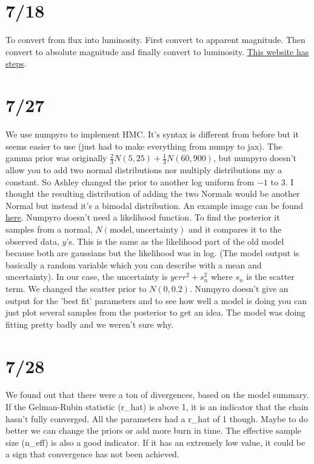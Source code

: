 \documentclass[12pt]{article}
\begin{document}
\section{7/18}
To convert from flux into luminosity. First convert to apparent magnitude. Then convert to absolute magnitude and finally convert to luminosity. \href{http://csep10.phys.utk.edu/OJTA2dev/ojta/c2c/ordinary_stars/magnitudes/absolute_tl.html}{This website has steps}. 


\section{7/27}
We use numpyro to implement HMC. It's syntax is different from before but it seems easier to use (just had to make everything from numpy to jax). The gamma prior was originally $\frac{2}{3} N(5, 25) + \frac{1}{3} N(60, 900)$, but numpyro doesn't allow you to add two normal distributions nor multiply distributions my a constant. So Ashley changed the prior to another log uniform from $-1$ to $3$. I thought the resulting distribution of adding the two Normals would be another Normal but instead it's a bimodal distribution. An example image can be found \href{https://upload.wikimedia.org/wikipedia/commons/thumb/b/bc/Bimodal_geological.PNG/220px-Bimodal_geological.PNG}{here}. Numpyro doesn't need a likelihood function. To find the posterior it samples from a normal, $N(\text{model}, \text{uncertainty})$ and it compares it to the observed data, $y$'s. This is the same as the likelihood part of the old model because both are gaussians but the likelihood was in log. (The model output is basically a random variable which you can describe with a mean and uncertainty). In our case, the uncertainty is $yerr^2 + s_n^2$ where $s_n$ is the scatter term. We changed the scatter prior to $N(0, 0.2)$. Numpyro doesn't give an output for the 'best fit' parameters and to see how well a model is doing you can just plot several samples from the posterior to get an idea. The model was doing fitting pretty badly and we weren't sure why.

\section{7/28}
We found out that there were a ton of divergences, based on the model summary. If the Gelman-Rubin statistic (r\_hat) is above 1, it is an indicator that the chain hasn't fully converged. All the parameters had a r\_hat of 1 though. Maybe to do better we can change the priors or add more burn in time. The effective sample size (n\_eff) is also a good indicator. If it has an extremely low value, it could be a sign that convergence has not been achieved.
\end{document}
